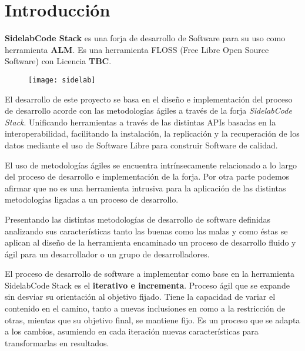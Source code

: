 \chapter{Introducci\'on}
\label{chap:introduccion}

\par \textbf{SidelabCode Stack} es una forja de desarrollo de Software para su uso como herramienta \textbf{ALM}. Es una herramienta FLOSS (Free Libre Open Source Software) con Licencia \textbf{TBC}.

\begin{figure}[h]
    \begin{center}	
        \texttt{[image: sidelab]}
        \label{fig:sidelab}
    \end{center}
\end{figure}

\par El desarrollo de este proyecto se basa en el dise\~no e implementaci\'on del proceso de desarrollo acorde con las metodolog\'ias \'agiles a trav\'es de la forja \emph{SidelabCode Stack}. Unificando herramientas a trav\'es de las distintas APIs basadas en la interoperabilidad, facilitando la instalaci\'on, la replicaci\'on y la recuperaci\'on de los datos mediante el uso de Software Libre para construir Software de calidad.

\par El uso de metodolog\'ias \'agiles se encuentra intr\'insecamente relacionado a lo largo del proceso de desarrollo e implementaci\'on de la forja. Por otra parte podemos afirmar que no es una herramienta intrusiva para la aplicaci\'on de las distintas metodolog\'ias ligadas a un proceso de desarrollo.

\par Presentando las distintas metodolog\'ias de desarrollo de software definidas analizando sus caracter\'isticas tanto las buenas como las malas y como \'estas se aplican al dise\~no de la herramienta encaminado un proceso de desarrollo fluido y \'agil para un desarrollador o un grupo de desarrolladores.

\par El proceso de desarrollo de software a implementar como base en la herramienta SidelabCode Stack es el \textbf{iterativo e incrementa}. Proceso ágil que se expande sin desviar su orientación al objetivo fijado. Tiene la capacidad de variar el contenido en el camino, tanto a nuevas inclusiones en como a la restricción de otras, mientas que su objetivo final, se mantiene fijo. Es un proceso que se adapta a los cambios, asumiendo en cada iteración nuevas características para transformarlas en resultados.

